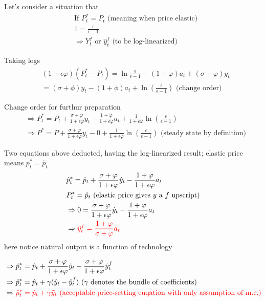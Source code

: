 \documentclass{article}
\begin{document}
Let's consider a situation that
\begin{align}
& \text{If } P_{t}^{*}=P_t \text{ (meaning when price elastic)} 
\\& 1=\frac{\epsilon}{\epsilon-1}
\\& \Rightarrow Y_t^f \text{ or } \hat y_t^f \text{ (to be log-linearized)}
\end{align}


Taking logs
\begin{align}
& 
(1+\epsilon \varphi)(P^*_t - P_t)=\ln \frac{\epsilon}{\epsilon-1}-(1+\varphi)a_t+(\sigma+\varphi)y_t
\\& = (\sigma+\phi)y_t-(1+\phi)a_t+\ln(\frac{\epsilon}{\epsilon-1}) 
\text{ (change order)}
\end{align}

Change order for furthur preparation
\begin{align}
& \Rightarrow P_t^*=P_t + \frac{\sigma+\varphi}{1+\epsilon\varphi}y_t - \frac{1+\varphi}{1+\epsilon \varphi} a_t+ \frac{1}{1+\epsilon \varphi}\ln (\frac{\epsilon}{\epsilon-1})
\\& \Rightarrow  P^*=P+\frac{\sigma+\varphi}{1+\epsilon\varphi}y_t-0+\frac{1}{1+\epsilon \varphi}\ln (\frac{\epsilon}{\epsilon-1})
\text{ (steady state by definition)}
\end{align}

Two equations above deducted, having the log-linearized result; elastic price means $p_t^*=\hat p_t$
\begin{align}
& \hat p_t^*=\hat p_t + \frac{\sigma+\varphi}{1+\epsilon\varphi} \hat y_t -\frac{1+\varphi}{1+\epsilon\varphi} a_t
\\& P_t^*=\hat p_t \text{ (elastic price gives $y$ a $f$ upscript)}
\\& \Rightarrow 0=\frac{\sigma+\varphi}{1+\epsilon\varphi} \hat y_t -\frac{1+\varphi}{1+\epsilon\varphi} a_t
\\& \Rightarrow \color{red} \hat y_t^f = \frac{1+\varphi}{\sigma+\varphi}a_t
\end{align}
here notice natural output is a function of technology

\begin{align}
& \Rightarrow \hat p_t^*=\hat p_t +\frac{\sigma+\varphi}{1+\epsilon\varphi} \hat y_t-\frac{\sigma+\varphi}{1+\epsilon\varphi} \hat y_t^f
\\& \Rightarrow \hat p_t^*=\hat p_t +\gamma (\hat y_t-\hat y_t^f) \text{ ($\gamma$ denotes the bundle of coefficients)}
\\& \Rightarrow \color{red} \hat p_t^*=\hat p_t +\gamma \tilde y_t \text{ (acceptable price-setting euqation with only assumption of m.c.)} 
\end{align}
\end{document}
